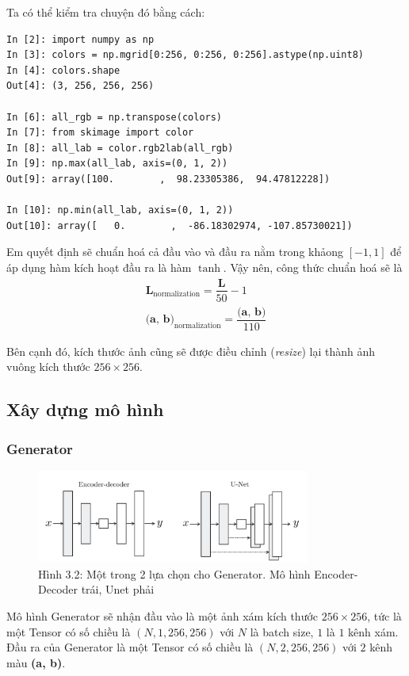 \documentclass[a4paper]{article}
\begin{document}
\noindent
Ta có thể kiểm tra chuyện đó bằng cách:
\begin{lstlisting}
In [2]: import numpy as np
In [3]: colors = np.mgrid[0:256, 0:256, 0:256].astype(np.uint8)
In [4]: colors.shape
Out[4]: (3, 256, 256, 256)

In [6]: all_rgb = np.transpose(colors)
In [7]: from skimage import color
In [8]: all_lab = color.rgb2lab(all_rgb)
In [9]: np.max(all_lab, axis=(0, 1, 2))
Out[9]: array([100.        ,  98.23305386,  94.47812228])

In [10]: np.min(all_lab, axis=(0, 1, 2))
Out[10]: array([   0.        ,  -86.18302974, -107.85730021])
\end{lstlisting}

\noindent
Em quyết định sẽ chuẩn hoá cả đầu vào và đầu ra nằm trong khảong $[-1, 1]$ để áp dụng hàm kích hoạt đầu ra là hàm $\tanh$. Vậy nên, công thức chuẩn hoá sẽ là
\begin{align*}
    \textbf{L}_{\text{normalization}} = \dfrac{\textbf{L}}{50} - 1\\
    \textbf{(a, b)}_{\text{normalization}} = \dfrac{\textbf{(a, b)}}{110}
\end{align*}

\noindent
Bên cạnh đó, kích thước ảnh cũng sẽ được điều chỉnh (\textit{resize}) lại thành ảnh vuông kích thước $256\times 256$.

\subsection{Xây dựng mô hình}

\subsubsection{Generator}
\begin{figure}[h!]
\centering
\includegraphics[width=9cm]{images/3_2.PNG}
\caption{Hình 3.2: Một trong 2 lựa chọn cho Generator. Mô hình Encoder-Decoder trái, Unet phải}
\end{figure}

\noindent
Mô hình Generator sẽ nhận đầu vào là một ảnh xám kích thước $256\times 256$, tức là một Tensor có số chiều là $(N, 1, 256, 256)$ với $N$ là batch size, $1$ là $1$ kênh xám. Đầu ra của Generator là một Tensor có số chiều là $(N, 2, 256, 256)$ với $2$ kênh màu \textbf{(a, b)}.\\
\end{document}
